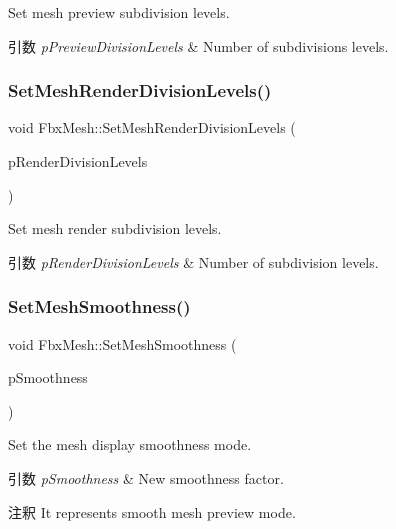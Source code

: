 Set mesh preview subdivision levels. 
\begin{DoxyParams}{引数}
{\em p\+Preview\+Division\+Levels} & Number of subdivisions levels. \\
\hline
\end{DoxyParams}
\mbox{\label{class_fbx_mesh_a3926ddbfb4988f931ffdceef555243a6}} 
\subsubsection{\texorpdfstring{Set\+Mesh\+Render\+Division\+Levels()}{SetMeshRenderDivisionLevels()}}
{\footnotesize\ttfamily void Fbx\+Mesh\+::\+Set\+Mesh\+Render\+Division\+Levels (\begin{DoxyParamCaption}\item[{int}]{p\+Render\+Division\+Levels }\end{DoxyParamCaption})}

Set mesh render subdivision levels. 
\begin{DoxyParams}{引数}
{\em p\+Render\+Division\+Levels} & Number of subdivision levels. \\
\hline
\end{DoxyParams}
\mbox{\label{class_fbx_mesh_ab07446f1c0dd0bae4597bb20a9d27265}} 
\subsubsection{\texorpdfstring{Set\+Mesh\+Smoothness()}{SetMeshSmoothness()}}
{\footnotesize\ttfamily void Fbx\+Mesh\+::\+Set\+Mesh\+Smoothness (\begin{DoxyParamCaption}\item[{\hyperlink{class_fbx_mesh_a7ac812140810290f718863c170279cf3}{Fbx\+Mesh\+::\+E\+Smoothness}}]{p\+Smoothness }\end{DoxyParamCaption})}

Set the mesh display smoothness mode. 
\begin{DoxyParams}{引数}
{\em p\+Smoothness} & New smoothness factor. \\
\hline
\end{DoxyParams}
\begin{DoxyRemark}{注釈}
It represents smooth mesh preview mode. 
\end{DoxyRemark}
\mbox{\label{class_fbx_mesh_ab7c7d2325c2afa2c7bd0099b9a0f24dc}} 
